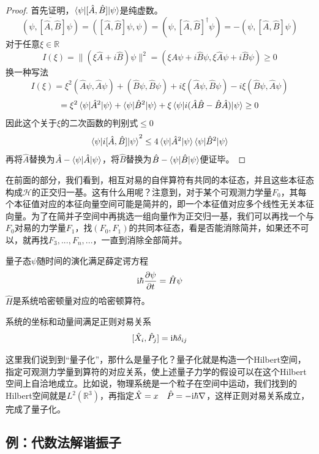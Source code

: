 \begin{proof}
    首先证明，$\braket{\psi|[\hat{A},\hat{B}]|\psi}$是纯虚数。
    $$\overline{(\psi,[\hat{A},\hat{B}]\psi)}=([\hat{A},\hat{B}]\psi,\psi)=(\psi,[\hat{A},\hat{B}]^\dagger\psi)=-(\psi,[\hat{A},\hat{B}]\psi)$$
    对于任意$\xi\in\mathbb{R}$
    $$I(\xi)=\|(\xi\hat{A}+i\hat{B})\psi\|^2=(\xi\hat{A}\psi+i\hat{B}\psi,\xi\hat{A}\psi+i\hat{B}\psi)\geq 0$$
    换一种写法
    $$I(\xi)=\xi^2(\hat{A}\psi,\hat{A}\psi)+(\hat{B}\psi,\hat{B}\psi)+i\xi(\hat{A}\psi,\hat{B}\psi)-i\xi(\hat{B}\psi,\hat{A}\psi)$$
    $$=\xi^2\braket{\psi|\hat{A}^2|\psi}+\braket{\psi|\hat{B}^2|\psi}+\xi\braket{\psi|i(\hat{A}\hat{B}-\hat{B}\hat{A})|\psi}\geq 0$$
    因此这个关于$\xi$的二次函数的判别式$\leq 0$
    $$\braket{\psi|i[\hat{A},\hat{B}]|\psi}^2\leq 4\braket{\psi|\hat{A}^2|\psi}\braket{\psi|\hat{B}^2|\psi}$$
    再将$\hat{A}$替换为$\hat{A}-\braket{\psi|\hat{A}|\psi}$，将$\hat{B}$替换为$\hat{B}-\braket{\psi|\hat{B}|\psi}$便证毕。
\end{proof}

在前面的部分，我们看到，相互对易的自伴算符有共同的本征态，并且这些本征态构成$\mathcal{H}$的正交归一基。这有什么用呢？注意到，对于某个可观测力学量$F_0$，其每个本征值对应的本征向量空间可能是简并的，即一个本征值对应多个线性无关本征向量。为了在简并子空间中再挑选一组向量作为正交归一基，我们可以再找一个与$F_0$对易的力学量$F_1$，找$(F_0,F_1)$的共同本征态，看是否能消除简并，如果还不可以，就再找$F_3,...,F_n,...$，一直到消除全部简并。
\begin{postulate}[时间演化假设]
    量子态$\psi$随时间的演化满足薛定谔方程
    $$\mathrm{i}\hbar\frac{\partial\psi}{\partial t}=\hat{H}\psi$$
    $\hat{H}$是系统哈密顿量对应的哈密顿算符。
\end{postulate}
\begin{postulate}[正则量子化方案]
    系统的坐标和动量间满足正则对易关系$$[\hat{X}_i,\hat{P}_j]=\mathrm{i}\hbar\delta_{ij}$$
\end{postulate}

这里我们说到到“量子化”，那什么是量子化？量子化就是构造一个Hilbert空间，指定可观测力学量到算符的对应关系，使上述量子力学的假设可以在这个Hilbert空间上自洽地成立。比如说，物理系统是一个粒子在空间中运动，我们找到的Hilbert空间就是$L^2(\mathbb{R}^3)$，再指定$\hat{X}=x\quad\hat{P}=-\mathrm{i}\hbar\nabla$，这样正则对易关系成立，完成了量子化。
\subsection{例：代数法解谐振子}

